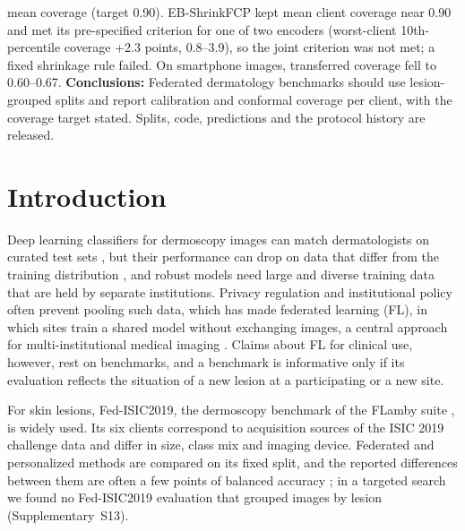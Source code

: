 \documentclass[VANCOUVER,Times1COL]{WileyNJDv5}
\begin{document}
{mean coverage (target 0.90). EB-ShrinkFCP kept mean client coverage near 0.90 and met its pre-specified
criterion for one of two encoders (worst-client 10th-percentile coverage +2.3 points, 0.8--3.9), so the
joint criterion was not met; a fixed shrinkage rule failed. On smartphone images, transferred coverage
fell to 0.60--0.67.
\textbf{Conclusions:} Federated dermatology benchmarks should use lesion-grouped splits and report
calibration and conformal coverage per client, with the coverage target stated. Splits, code, predictions
and the protocol history are released.}



\maketitle

\renewcommand\thefootnote{}
\renewcommand\thefootnote{\fnsymbol{footnote}}
\setcounter{footnote}{1}

\section{Introduction}
\label{sec:intro}

Deep learning classifiers for dermoscopy images can match dermatologists on curated test sets
\cite{esteva2017dermatologist}, but their performance can drop on
data that differ from the training distribution \cite{daneshjou2022disparities}, and robust models need
large and diverse training data that are held by separate institutions. Privacy regulation and
institutional policy often prevent pooling such data, which has made federated learning (FL), in which
sites train a shared model without exchanging images, a central approach for multi-institutional medical
imaging \cite{rieke2020future,sheller2020federated,dayan2021exam}. Claims about FL
for clinical use, however, rest on benchmarks, and a benchmark is informative only if its evaluation
reflects the situation of a new lesion at a participating or a new site.

For skin lesions, Fed-ISIC2019, the dermoscopy benchmark of the FLamby suite \cite{flamby2022}, is
widely used. Its six clients correspond to acquisition sources of the ISIC 2019 challenge data
\cite{codella2018isic,tschandl2018ham,combalia2019bcn} and differ in size, class mix and imaging
device. Federated and personalized methods are compared on its fixed split, and the reported differences
between them are often a few points of balanced accuracy \cite{flamby2022,tavakoli2024fendafl};
in a targeted search we found no Fed-ISIC2019 evaluation that grouped images by lesion
(Supplementary~S13).
\end{document}
